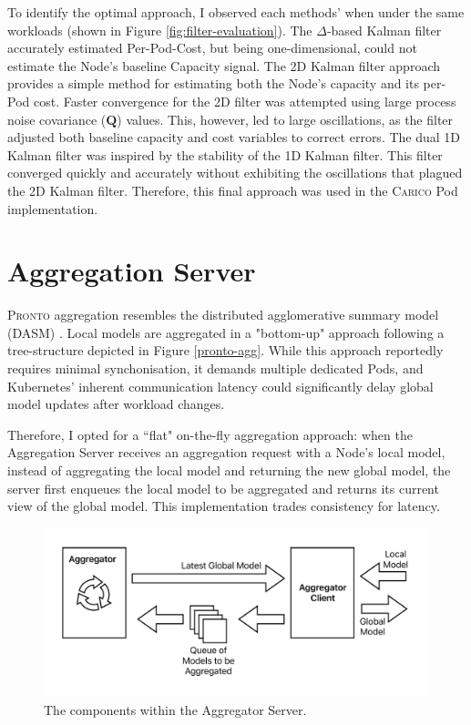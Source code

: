 To identify the optimal approach, I observed each methods' when under the same
workloads (shown in Figure \ref{fig:filter-evaluation}). The $\Delta$-based
Kalman filter accurately estimated Per-Pod-Cost, but being one-dimensional,
could not estimate the Node's baseline Capacity signal. The 2D Kalman filter
approach provides a simple method for estimating both the Node's capacity and
its per-Pod cost. Faster convergence for the 2D filter was attempted using large
process noise covariance ($\mathbf{Q}$) values. This, however, led to large
oscillations, as the filter adjusted both baseline capacity and cost variables
to correct errors. The dual 1D Kalman filter was inspired by the stability of
the 1D Kalman filter. This filter converged quickly and accurately without
exhibiting the oscillations that plagued the 2D Kalman filter. Therefore, this
final approach was used in the \textsc{Carico} Pod implementation.

\section{Aggregation Server}
\textsc{Pronto} aggregation resembles the distributed agglomerative summary
model (DASM) \cite{}. Local models are aggregated in a "bottom-up" approach
following a tree-structure depicted in Figure \ref{pronto-agg}. While this
approach reportedly requires minimal synchonisation, it demands
multiple dedicated Pods, and Kubernetes' inherent communication latency could
significantly delay global model updates after workload changes.

Therefore, I opted for a ``flat" on-the-fly aggregation approach: when the
Aggregation Server receives an aggregation request with a Node's local model,
instead of aggregating the local model and returning the new global model, the
server first enqueues the local model to be aggregated and returns its current
view of the global model. This implementation trades consistency for latency.

\begin{figure}[ht]
    \centering
    \includegraphics[width=\textwidth]{images/spazio-agg.pdf}
    \caption{The components within the Aggregator Server.}
    \label{spazio-agg-components}
\end{figure}

